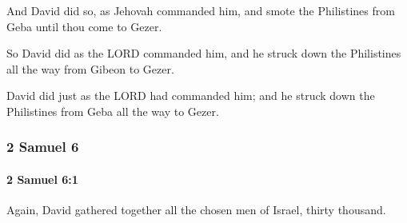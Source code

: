 			\begin{versebox}
					\item[BHS] 
					\item[ASV] And David did so, as Jehovah commanded him, and smote the Philistines from Geba until thou come to Gezer.
					\item[NIV] So David did as the LORD commanded him, and he struck down the Philistines all the way from Gibeon to Gezer.
					\item[NRSV] David did just as the LORD had commanded him; and he struck down the Philistines from Geba all the way to Gezer.
			\end{versebox}
	\subsubsection{2 Samuel 6} %
		\label{2SAMUEL-6}

		\paragraph{2 Samuel 6:1} %
			\label{2SAMUEL-6-1}

			Again, David gathered together all the chosen men of Israel, thirty thousand.

